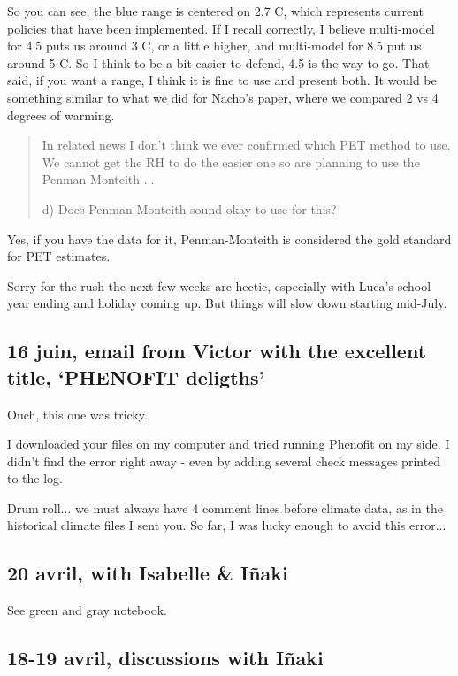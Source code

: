 \documentclass[11pt,letter]{article}
\begin{document}
So you can see, the blue range is centered on 2.7 C, which represents current policies that have been implemented. If I recall correctly, I believe multi-model for 4.5 puts us around 3 C, or a little higher, and multi-model for 8.5 put us around 5 C. So I think to be a bit easier to defend, 4.5 is the way to go. That said, if you want a range, I think it is fine to use and present both. It would be something similar to what we did for Nacho’s paper, where we compared 2 vs 4 degrees of warming.

\begin{quote}
In related news I don't think we ever confirmed which PET method to use. We cannot get the RH to do the easier one so are planning to use the Penman Monteith  ...

d) Does Penman Monteith sound okay to use for this?
\end{quote}

Yes, if you have the data for it, Penman-Monteith is considered the gold standard for PET estimates.

Sorry for the rush-the next few weeks are hectic, especially with Luca’s school year ending and holiday coming up. But things will slow down starting mid-July.

\subsection{16 juin, email from Victor with the excellent title, `PHENOFIT deligths'}

Ouch, this one was tricky.

I downloaded your files on my computer and tried running Phenofit on my side.
I didn’t find the error right away - even by adding several check messages printed to the log.

Drum roll... we must always have 4 comment lines before climate data, as in the historical climate files I sent you.
So far, I was lucky enough to avoid this error... 

\subsection{20 avril, with Isabelle \& I\~naki}
See green and gray notebook. 

\subsection{18-19 avril, discussions with I\~naki}
\end{document}
